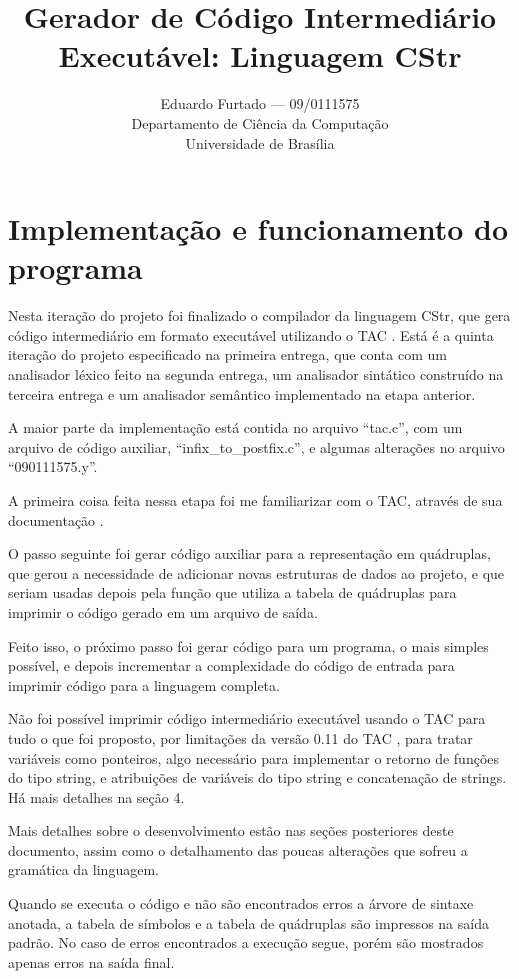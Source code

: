 \documentclass[12pt]{article}
\title{Gerador de Código Intermediário Executável: Linguagem CStr}
\author{Eduardo Furtado --- 09/0111575\\Departamento de Ciência da Computação\\Universidade de Brasília}
\begin{document}
\maketitle

\section{Implementação e funcionamento do programa}

\indent

Nesta iteração do projeto foi finalizado o compilador da linguagem CStr, que gera código intermediário em formato executável utilizando o TAC \cite{tac2014}. Está é a quinta iteração do projeto especificado na primeira entrega, que conta com um analisador léxico feito na segunda entrega, um analisador sintático construído na terceira entrega e um analisador semântico implementado na etapa anterior.

A maior parte da implementação está contida no arquivo ``tac.c'', com um arquivo de código auxiliar, ``infix\_to\_postfix.c'', e algumas alterações no arquivo ``090111575.y''.

A primeira coisa feita nessa etapa foi me familiarizar com o TAC, através de sua documentação \cite{tac2014}.

O passo seguinte foi gerar código auxiliar para a representação em quádruplas, que gerou a necessidade de adicionar novas estruturas de dados ao projeto, e que seriam usadas depois pela função que utiliza a tabela de quádruplas para imprimir o código gerado em um arquivo de saída.

Feito isso, o próximo passo foi gerar código para um programa, o mais simples possível, e depois incrementar a complexidade do código de entrada para imprimir código para a linguagem completa.

Não foi possível imprimir código intermediário executável usando o TAC para tudo o que foi proposto, por limitações da versão 0.11 do TAC \cite{tac2014}, para tratar variáveis como ponteiros, algo necessário para implementar o retorno de funções do tipo string, e atribuições de variáveis do tipo string e concatenação de strings. Há mais detalhes na seção 4.

Mais detalhes sobre o desenvolvimento estão nas seções posteriores deste documento, assim como o detalhamento das poucas alterações que sofreu a gramática da linguagem.

Quando se executa o código e não são encontrados erros a árvore de sintaxe anotada, a tabela de símbolos e a tabela de quádruplas são impressos na saída padrão. No caso de erros encontrados a execução segue, porém são mostrados apenas erros na saída final.
\end{document}
